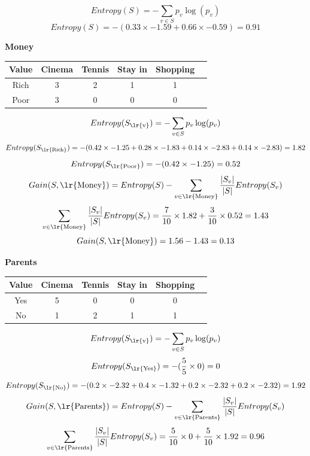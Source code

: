 \documentclass{article}
\newcommand{\tf}[1]{\text{\lr{#1}}}
\begin{document}
	\vspace{5pt}
	\[
	Entropy(S) = -\sum_{v \in S} p_v\log (p_v)
	\]
	\[
	Entropy(S) = -( 0.33 \times -1.59 + 0.66 \times -0.59) = 0.91
	\]
	\begin{latin}
		\textbf{Money}
		\begin{center}
			\begin{tabular}{|c|c|c|c|c|c|}
				\hline
				Value & Cinema & Tennis & Stay in & Shopping\\
				\hline
				\hline
				Rich & ‌3& 2 & 1 & 1\\
				\hline
				Poor & 3 & 0 & 0 & 0\\
				\hline
			\end{tabular}
		\end{center}
	\end{latin}
	\vspace{5pt}
	\[
	Entropy(S_{\text{\lr{v}}}) = -\sum_{v \in S} p_v\log (p_v)
	\]
	\[
	Entropy(S_{\tf{Rich}}) = -(0.42 \times -1.25 + 0.28 \times -1.83 + 0.14 \times -2.83 + 0.14 \times -2.83) = 1.82
	\]
	\[
	Entropy(S_{\tf{Poor}}) = -(0.42 \times -1.25) = 0.52
	\]
	\vspace{10pt}
	\[
	Gain(S, \tf{Money}) = Entropy(S) - \sum_{v \in \tf{Money}} \frac{| S_v |}{| S |}Entropy(S_v)
	\] 
	\[
	\sum_{v \in \tf{Money}} \frac{| S_v |}{| S |}Entropy(S_v) = \frac{7}{10} \times 1.82 + \frac{3}{10} \times 0.52 = 1.43
	\]
	\[
	Gain(S, \tf{Money}) = 1.56 - 1.43 = 0.13
	\]
	\begin{latin}
		\textbf{Parents}
		\begin{center}
			\begin{tabular}{|c|c|c|c|c|c|}
				\hline
				Value & Cinema & Tennis & Stay in & Shopping\\
				\hline
				\hline
				Yes & ‌5& 0 & 0 & 0\\
				\hline
				No & 1 & 2 & 1 & 1\\
				\hline
			\end{tabular}
		\end{center}
	\end{latin}
	\vspace{5pt}
	\[
	Entropy(S_{\tf{v}}) = -\sum_{v \in S} p_v\log (p_v)
	\]
	\[
	Entropy(S_{\tf{Yes}}) = -(\frac{5}{5} \times 0) = 0
	\]
	\[
	Entropy(S_{\tf{No}}) = -(0.2 \times -2.32 + 0.4 \times -1.32 + 0.2 \times -2.32 + 0.2 \times -2.32) = 1.92
	\]
	\vspace{10pt}
	\[
	Gain(S, \tf{Parents}) = Entropy(S) - \sum_{v \in \tf{Parents}} \frac{| S_v |}{| S |}Entropy(S_v)
	\] 
	\[
	\sum_{v \in \tf{Parents}} \frac{| S_v |}{| S |}Entropy(S_v) = \frac{5}{10} \times 0 + \frac{5}{10} \times 1.92 = 0.96
	\]
\end{document}
